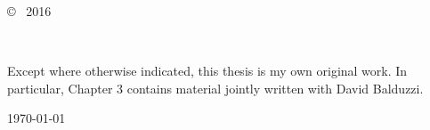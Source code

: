 \vspace*{14cm}
\begin{center}
  \makeatletter
  \copyright\ \@author{} 2016
  \makeatother
\end{center}
\noindent
\begin{center}
  \footnotesize{~} %
\end{center}
\noindent

\newpage

\vspace*{7cm}
\begin{center}
  Except where otherwise indicated, this thesis is my own original work. In particular, Chapter 3 contains material jointly written with David Balduzzi.
\end{center}

\vspace*{4cm}

\hspace{8cm}\makeatletter\@author\makeatother\par
\hspace{8cm}\today
